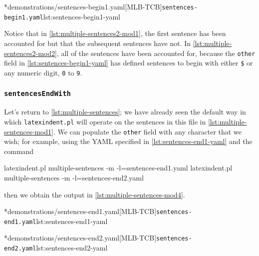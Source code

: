 	\begin{minipage}{.55\linewidth}
	\end{minipage}
	\hfill
	\begin{minipage}{.45\linewidth}
		\cmhlistingsfromfile*[style=yaml-LST]*{demonstrations/sentences-begin1.yaml}[MLB-TCB]{\texttt{sentences-begin1.yaml}}{lst:sentences-begin1-yaml}
	\end{minipage}
	Notice that in \cref{lst:multiple-sentences2-mod1}, the first sentence has been accounted for but that the subsequent sentences have not.
	In \cref{lst:multiple-sentences2-mod2}, all of the sentences have been accounted for, because the \texttt{other} field in \cref{lst:sentences-begin1-yaml} has defined sentences to begin with either \lstinline!$! or any numeric digit, \texttt{0} to \texttt{9}.

\subsubsection{\texttt{sentencesEndWith}}
	Let's return to \vref{lst:multiple-sentences}; we have already seen the default way in which \texttt{latexindent.pl} will operate on the sentences in this file in \vref{lst:multiple-sentences-mod1}.
	We can populate the \texttt{other} field with any character that we wish; for example, using the YAML specified in \cref{lst:sentences-end1-yaml} and the command \begin{commandshell}
latexindent.pl multiple-sentences -m -l=sentences-end1.yaml
latexindent.pl multiple-sentences -m -l=sentences-end2.yaml
\end{commandshell} then we obtain the output in \cref{lst:multiple-sentences-mod4}.

	\begin{minipage}{.5\linewidth}
	\end{minipage}
	\hfill
	\begin{minipage}{.5\linewidth}
		\cmhlistingsfromfile*[style=yaml-LST]*{demonstrations/sentences-end1.yaml}[MLB-TCB]{\texttt{sentences-end1.yaml}}{lst:sentences-end1-yaml}
	\end{minipage}

	\begin{minipage}{.5\linewidth}
	\end{minipage}
	\hfill
	\begin{minipage}{.5\linewidth}
		\cmhlistingsfromfile*[style=yaml-LST]*{demonstrations/sentences-end2.yaml}[MLB-TCB]{\texttt{sentences-end2.yaml}}{lst:sentences-end2-yaml}
	\end{minipage}

